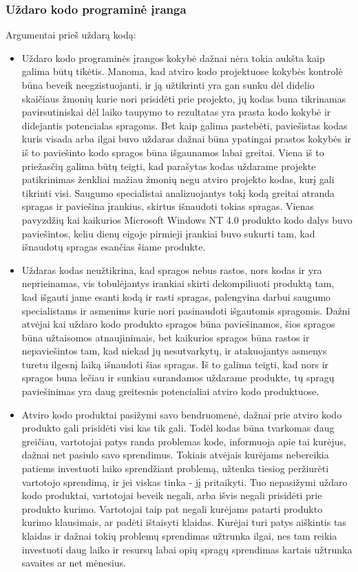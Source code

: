\documentclass[a4paper,12pt,fleqn]{article}
\begin{document}
\subsubsection{Uždaro kodo programinė įranga}
\label{sec:data}
Argumentai prieš uždarą kodą:
\begin{itemize}
	\item Uždaro kodo programinės įrangos kokybė dažnai nėra tokia aukšta kaip galima būtų tikėtis. Manoma, kad atviro kodo projektuose kokybės kontrolė būna beveik neegzistuojanti, ir ją užtikrinti yra gan sunku dėl didelio skaičiaus žmonių kurie nori prisidėti prie projekto, jų kodas buna tikrinamas pavirsutiniskai dėl laiko taupymo to rezultatas yra prasta kodo kokybė ir didejantis potencialas spragoms. Bet kaip galima pastebėti, paviešistas kodas kuris visada arba ilgai buvo uždaras dažnai būna ypatingai prastos kokybės ir iš to paviešinto kodo spragos būna išgaunamos labai greitai. Viena iš to priežasčių galima būtų teigti, kad parašytas kodas uždarame projekte patikrinimas ženkliai mažiau žmonių negu atviro projekto kodas, kurį gali tikrinti visi. Saugumo specialistai analizuojantys tokį kodą greitai atranda spragas ir paviešina įrankius, skirtus išnaudoti tokias spragas. Vienas pavyzdžių  kai kaikurios Microsoft Windows NT 4.0 produkto kodo dalys buvo paviešintos, keliu dienų eigoje pirmieji įrankiai buvo sukurti tam, kad išnaudotų spragas esančias šiame produkte\cite{hoepman2008increased}. 
	\item Uždaras kodas neužtikrina, kad spragos nebus rastos, nors kodas ir yra neprieinamas, vis tobulėjantys irankiai skirti dekompiliuoti produktą tam, kad išgauti jame esanti kodą ir rasti spragas, palengvina darbui saugumo specialistams ir asmenims kurie nori pasinaudoti išgautomis spragomis. Dažni atvėjai kai uždaro kodo produkto spragos būna paviešinamos, šios spragos būna užtaisomos atnaujinimais, bet kaikurios spragos būna rastos ir nepaviešintos tam, kad niekad jų nesutvarkytų, ir atakuojantys asmenys turetu ilgesnį laiką išnaudoti šias spragas. Iš to galima teigti, kad nors ir spragos buna lečiau ir sunkiau surandamos uždarame produkte, tų spragų paviešinimas yra daug greitesnis potencialiai atviro kodo produktuose\cite{mishra2002quality}. 
	\item Atviro kodo produktai pasižymi savo bendruomenė, dažnai prie atviro kodo produkto gali prisidėti visi kas tik gali. Todėl kodas būna tvarkomas daug greičiau, vartotojai patys randa problemas kode, informuoja apie tai kurėjus, dažnai net pasiulo savo sprendimus. Tokiais atvėjais kurėjams nebereikia patiems investuoti laiko sprendžiant problemą, užtenka tiesiog peržiurėti vartotojo sprendimą, ir jei viskas tinka - jį pritaikyti. Tuo nepasižymi uždaro kodo produktai, vartotojai beveik negali, arba išvis negali prisidėti prie produkto kurimo. Vartotojai taip pat negali kurėjams patarti produkto kurimo klausimais, ar padėti ištaisyti klaidas. Kurėjai turi patys aiškintis tas klaidas ir dažnai tokių problemų sprendimas užtrunka ilgai, nes tam reikia investuoti daug laiko ir resursų labai opių spragų sprendimas kartais užtrunka savaites ar net mėnesius\cite{hoepman2008increased}. 
\end{itemize}
\end{document}
